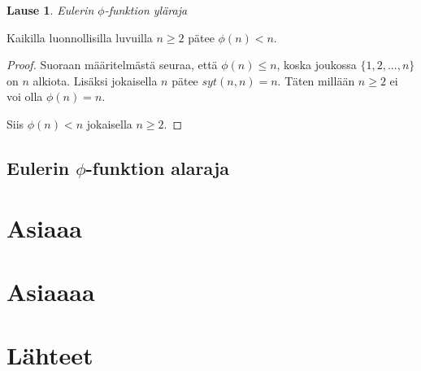 \documentclass{article}
\theoremstyle{definition}
\newtheorem{lause}[subsection]{Lause}
\begin{document}
\begin{lause}{\emph{Eulerin $\phi$-funktion yläraja}}

Kaikilla luonnollisilla luvuilla $n \geq 2$ pätee $\phi(n) < n$.

\begin{proof}

Suoraan määritelmästä seuraa, että $\phi(n) \leq n$, koska joukossa $\{1,2,...,n\}$ on $n$ alkiota. Lisäksi jokaisella $n$ pätee $syt(n,n) = n$. Täten millään $n \geq 2$ ei voi olla $\phi(n) = n$.

Siis $\phi(n) < n$ jokaisella $n \geq 2$.

\end{proof}

\end{lause}

\subsection{Eulerin $\phi$-funktion alaraja}

\section{Asiaaa}

\section{Asiaaaa}

\section{Lähteet}

\printbibliography[heading=none]
\end{document}

